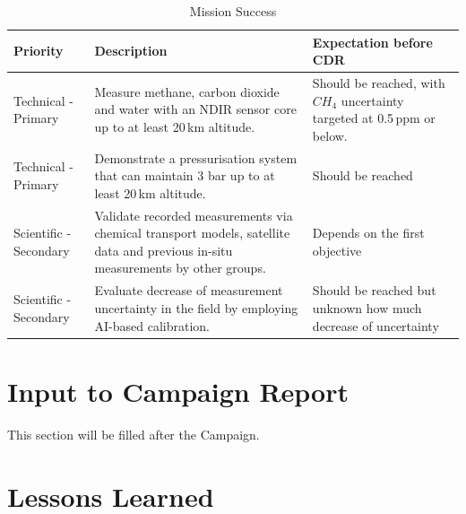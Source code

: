\begin{table}[H]
\centering
\caption{Mission Success}
\label{tab:mission_success}
\begin{tabularx}{0.9\textwidth}{p{2cm}p{5cm}p{5cm}}
\toprule
\textbf{Priority} & \textbf{Description} & \textbf{Expectation before CDR} \\
\midrule
Technical - Primary & Measure methane, carbon dioxide and water with an NDIR sensor core up to at least 20\,km altitude. & Should be reached, with $CH_4$ uncertainty targeted at 0.5\,ppm or below. \\
Technical - Primary & Demonstrate a pressurisation system that can maintain 3 bar up to at least 20\,km altitude.& Should be reached \\
Scientific - Secondary & Validate recorded measurements via chemical transport models, satellite data and previous in-situ measurements by other groups.& Depends on the first objective \\
Scientific - Secondary & Evaluate decrease of measurement uncertainty in the field by employing AI-based calibration. & Should be reached but unknown how much decrease of uncertainty \\
\bottomrule
\end{tabularx}
\end{table}




\section{Input to Campaign Report}

This section will be filled after the Campaign.

\section{Lessons Learned}

